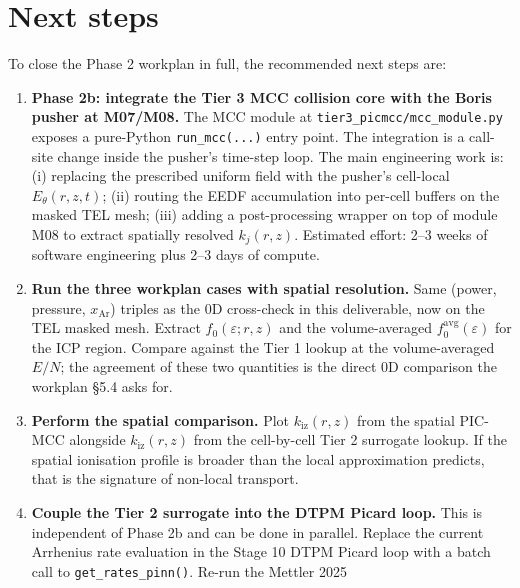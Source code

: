 \documentclass[11pt,a4paper]{article}
\begin{document}
\section{Next steps}
\label{sec:next}

To close the Phase 2 workplan in full, the recommended next steps
are:

\begin{enumerate}
  \item \textbf{Phase 2b: integrate the Tier 3 MCC collision core
        with the Boris pusher at M07/M08.} The MCC module at
        \texttt{tier3\_picmcc/mcc\_module.py} exposes a pure-Python
        \texttt{run\_mcc(...)} entry point. The integration is a
        call-site change inside the pusher's time-step loop. The
        main engineering work is: (i) replacing the prescribed
        uniform field with the pusher's cell-local $E_\theta(r, z,
        t)$; (ii) routing the EEDF accumulation into per-cell
        buffers on the masked TEL mesh; (iii) adding a
        post-processing wrapper on top of module M08 to extract
        spatially resolved $k_j(r, z)$. Estimated effort: 2--3
        weeks of software engineering plus 2--3 days of compute.
  \item \textbf{Run the three workplan cases with spatial
        resolution.} Same (power, pressure, $x_{\mathrm{Ar}}$)
        triples as the 0D cross-check in this deliverable, now on
        the TEL masked mesh. Extract $f_0(\varepsilon; r, z)$ and
        the volume-averaged $f_0^{\mathrm{avg}}(\varepsilon)$ for
        the ICP region. Compare against the Tier 1 lookup at the
        volume-averaged $E/N$; the agreement of these two
        quantities is the direct 0D comparison the workplan §5.4
        asks for.
  \item \textbf{Perform the spatial comparison.} Plot
        $k_{\mathrm{iz}}(r, z)$ from the spatial PIC-MCC alongside
        $k_{\mathrm{iz}}(r, z)$ from the cell-by-cell Tier 2
        surrogate lookup. If the spatial ionisation profile is
        broader than the local approximation predicts, that is the
        signature of non-local transport.
  \item \textbf{Couple the Tier 2 surrogate into the DTPM Picard
        loop.} This is independent of Phase 2b and can be done in
        parallel. Replace the current Arrhenius rate evaluation in
        the Stage 10 DTPM Picard loop with a batch call to
        \texttt{get\_rates\_pinn()}. Re-run the Mettler 2025

\end{enumerate}
\end{document}
